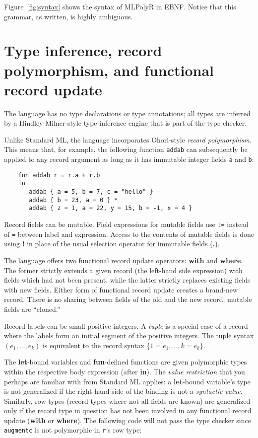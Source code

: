 \documentclass{article}
\begin{document}
Figure~\ref{fig:syntax} shows the syntax of MLPolyR in EBNF.  Notice
that this grammar, as written, is highly ambiguous.

\section{Type inference, record polymorphism, and functional record update}

The language has no type declarations or type annotations; all types
are inferred by a Hindley-Milner-style type inference engine that is
part of the type checker.

Unlike Standard ML, the language incorporates Ohori-style {\em record
  polymorphism}.  This means that, for example, the following function
{\tt addab} can subsequently be applied to any record argument as long
as it has immutable integer fields {\tt a} and {\tt b}:

\begin{verbatim}
    fun addab r = r.a + r.b
    in
       addab { a = 5, b = 7, c = "hello" } -
       addab { b = 23, a = 0 } *
       addab { z = 1, a = 22, y = 15, b = -1, x = 4 }

\end{verbatim}

Record fields can be mutable.  Field expressions for mutable fields
use {\tt :=} instead of {\tt =} between label and expression. Access
to the contents of mutable fields is done using {\bf !} in place of
the usual selection operator for immutable fields ({\bf .}).

The language offers two functional record update operators: {\bf with}
and {\bf where}.  The former strictly extends a given record (the
left-hand side expression) with fields which had not been present,
while the latter strictly replaces existing fields with new fields.
Either form of functional record update creates a brand-new record.
There is no sharing between fields of the old and the new record;
mutable fields are ``cloned.''

Record labels can be small positive integers.  A {\em tuple} is a
special case of a record where the labels form an initial segment of
the positive integers.  The tuple syntax $(e_1,\ldots,e_k)$ is equivalent to
the record syntax $\{ 1 = e_1, \ldots, k = e_k \}$.

The {\bf let}-bound variables and {\bf fun}-defined functions are
given polymorphic types within the respective body expression (after
{\bf in}).  The {\em value restriction} that you perhaps are familiar
with from Standard ML applies: a {\bf let}-bound variable's type is
not generalized if the right-hand side of the binding is not a {\em
  syntactic value}.  Similarly, row types (record types where not all
fields are known) are generalized only if the record type in question
has not been involved in any functional record update ({\bf with} or
{\bf where}).  The following code will not pass the type checker since
{\tt augmentc} is not polymorphic in {\tt r}'s row type:
\end{document}
